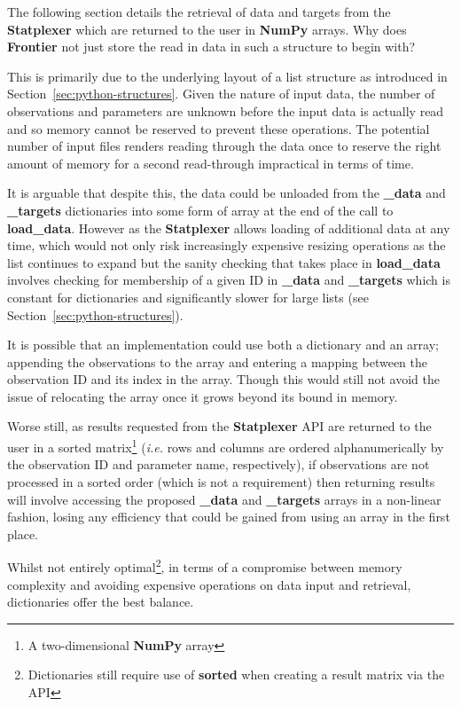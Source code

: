 The following section details the retrieval of data and targets from the
\textbf{Statplexer} which are returned to the user in \textbf{NumPy} arrays. Why
does \textbf{Frontier} not just store the read in data in such a structure to
begin with?

This is primarily due to the underlying layout of a list structure as introduced
in Section~\ref{sec:python-structures}. Given the nature of input data,
the number of observations and parameters are unknown before the input
data is actually read and so memory cannot be reserved to prevent these operations.
The potential number of input files renders reading through the data once to
reserve the right amount of memory for a second read-through impractical in
terms of time.

It is arguable that despite this, the data could be unloaded from the
\textbf{\_data} and \textbf{\_targets} dictionaries into some form of array at
the end of the call to \textbf{load\_data}. However as the \textbf{Statplexer}
allows loading of additional data at any time, which would not only risk
increasingly expensive resizing operations as the list continues to expand but
the sanity checking that takes place in \textbf{load\_data} involves checking
for membership of a given ID in \textbf{\_data} and \textbf{\_targets} which is
constant for dictionaries and significantly slower for large lists (see
Section~\ref{sec:python-structures}).

It is possible that an implementation could use both a dictionary and an array;
appending the observations to the array and entering a mapping between the
observation ID and its index in the array.  Though this would still not avoid
the issue of relocating the array once it grows beyond its bound in memory.

Worse still, as results requested from the \textbf{Statplexer} API are returned
to the user in a sorted matrix\footnote{A two-dimensional \textbf{NumPy} array}
(\textit{i.e.} rows and columns are ordered alphanumerically by the observation
ID and parameter name, respectively), if observations are not processed in a
sorted order (which is not a requirement) then returning results will involve
accessing the proposed \textbf{\_data} and \textbf{\_targets} arrays in a
non-linear fashion, losing any efficiency that could be gained from using an
array in the first place.

Whilst not entirely optimal\footnote{Dictionaries still require use of
\textbf{sorted} when creating a result matrix via the API}, in terms of a
compromise between memory complexity and avoiding expensive operations on data
input and retrieval, dictionaries offer the best balance.

